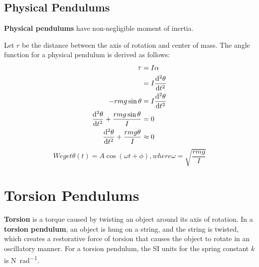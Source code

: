 \subsection{Physical Pendulums}

\textbf{Physical pendulums} have non-negligible moment of inertia.

Let \(r\) be the distance between the axis of rotation and center of mass.
The angle function for a physical pendulum is derived as follows:
\begin{equation}
    \begin{aligned}
        \tau &= I \alpha \\
        &= I \odv[2]{\theta}{t} \\
        - r m g \sin\theta &= I \odv[2]{\theta}{t} \\
        \odv[2]{\theta}{t} + \frac{r m g \sin\theta}{I} &= 0 \\
        \odv[2]{\theta}{t} + \frac{r m g \theta}{I} &\approx 0 \\
    \end{aligned}
\end{equation}
\begin{subequations}
    We get
    \begin{equation}
        \theta(t) = A \cos(\omega t + \phi),
    \end{equation}
    where
    \begin{equation}
        \omega = \sqrt{\frac{r m g}{I}}
    \end{equation}
\end{subequations}

\section{Torsion Pendulums}

\textbf{Torsion} is a torque caused by twisting an object around its
axis of rotation.
In a \textbf{torsion pendulum}, an object is hung on a string,
and the string is twisted,
which creates a restorative force of torsion
that causes the object to rotate in an oscillatory manner.
For a torsion pendulum,
the SI units for the spring constant \(k\) is \unit{\newton \per \radian}.

